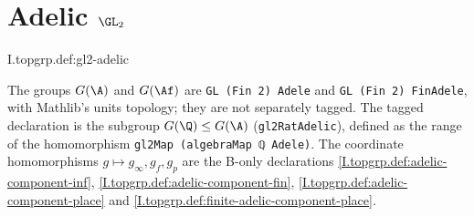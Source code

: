 \section{\texorpdfstring{Adelic $\GL_2$}{Adelic GL₂}}

\begin{definition}[adelic $\GL_2$]
\end{definition}
\begin{tfformal}{I.topgrp.def:gl2-adelic}
\begin{tffidelity}
The groups $G(\A)$ and $G(\Af)$ are \texttt{GL (Fin 2) Adele} and \texttt{GL (Fin 2) FinAdele}, with Mathlib's units topology; they are not separately tagged. The tagged declaration is the subgroup $G(\Q)\le G(\A)$ (\texttt{gl2RatAdelic}), defined as the range of the homomorphism \texttt{gl2Map (algebraMap ℚ Adele)}. The coordinate homomorphisms $g\mapsto g_\infty,g_f,g_p$ are the B-only declarations \cref{I.topgrp.def:adelic-component-inf}, \cref{I.topgrp.def:adelic-component-fin}, \cref{I.topgrp.def:adelic-component-place} and \cref{I.topgrp.def:finite-adelic-component-place}.
\end{tffidelity}
\end{tfformal}

